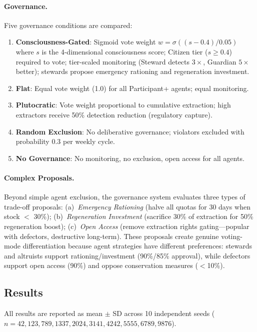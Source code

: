 \paragraph{Governance.}
Five governance conditions are compared:
\begin{enumerate}[nosep]
  \item \textbf{Consciousness-Gated}: Sigmoid vote weight $w = \sigma((s - 0.4)/0.05)$
    where $s$ is the 4-dimensional consciousness score; Citizen tier ($s \geq 0.4$) required
    to vote; tier-scaled monitoring (Steward detects $3\times$, Guardian $5\times$ better);
    stewards propose emergency rationing and regeneration investment.
  \item \textbf{Flat}: Equal vote weight (1.0) for all Participant+ agents; equal monitoring.
  \item \textbf{Plutocratic}: Vote weight proportional to cumulative extraction; high
    extractors receive 50\% detection reduction (regulatory capture).
  \item \textbf{Random Exclusion}: No deliberative governance; violators excluded with
    probability 0.3 per weekly cycle.
  \item \textbf{No Governance}: No monitoring, no exclusion, open access for all agents.
\end{enumerate}

\paragraph{Complex Proposals.}
Beyond simple agent exclusion, the governance system evaluates three types of trade-off
proposals: (a)~\emph{Emergency Rationing} (halve all quotas for 30 days when stock $<$
30\%); (b)~\emph{Regeneration Investment} (sacrifice 30\% of extraction for 50\%
regeneration boost); (c)~\emph{Open Access} (remove extraction rights gating---popular
with defectors, destructive long-term). These proposals create genuine voting-mode
differentiation because agent strategies have different preferences: stewards and altruists
support rationing/investment (90\%/85\% approval), while defectors support open access
(90\%) and oppose conservation measures ($<$10\%).

\subsection{Results}

All results are reported as mean $\pm$ SD across 10 independent seeds ($n = 42, 123,
789, 1337, 2024, 3141, 4242, 5555, 6789, 9876$).

